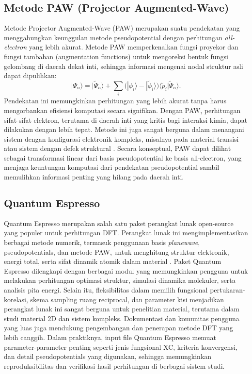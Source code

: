\subsection{Metode PAW (Projector Augmented-Wave)}
Metode Projector Augmented-Wave (PAW) merupakan suatu pendekatan yang menggabungkan keunggulan metode pseudopotential dengan perhitungan \emph{all-electron} yang lebih akurat.
Metode PAW memperkenalkan fungsi proyekor dan fungsi tambahan (augmentation functions) untuk mengoreksi bentuk fungsi gelombang di daerah dekat inti, sehingga informasi mengenai nodal struktur asli dapat dipulihkan:
\begin{equation}
|\Psi_n\rangle = |\tilde{\Psi}_n\rangle + \sum_i \Big(|\phi_i\rangle - |\tilde{\phi}_i\rangle\Big) \langle \tilde{p}_i |
\tilde{\Psi}_n \rangle.
\end{equation}
Pendekatan ini memungkinkan perhitungan yang lebih akurat tanpa harus mengorbankan efisiensi komputasi secara signifikan.
Dengan PAW, perhitungan sifat-sifat elektron, terutama di daerah inti yang kritis bagi interaksi kimia, dapat dilakukan dengan lebih tepat.
Metode ini juga sangat berguna dalam menangani sistem dengan konfigurasi elektronik kompleks, misalnya pada material transisi atau sistem dengan defek struktural \citep{Blochl1994}.
Secara konseptual, PAW dapat dilihat sebagai transformasi linear dari basis pseudopotential ke basis all-electron, yang menjaga keuntungan komputasi dari pendekatan pseudopotential sambil memulihkan informasi penting yang hilang pada daerah inti.

\subsection{Quantum Espresso}
Quantum Espresso merupakan salah satu paket perangkat lunak open-source yang populer untuk perhitungan DFT.
Perangkat lunak ini mengimplementasikan berbagai metode numerik, termasuk penggunaan basis \emph{planewave}, pseudopotentials, dan metode PAW, untuk menghitung struktur elektronik, energi total, serta sifat dinamik atomik dalam material \citep{Giannozzi2009}.
Paket Quantum Espresso dilengkapi dengan berbagai modul yang memungkinkan pengguna untuk melakukan perhitungan optimasi struktur, simulasi dinamika molekuler, serta analisis pita energi.
Selain itu, fleksibilitas dalam memilih fungsional pertukaran-korelasi, skema sampling ruang reciprocal, dan parameter kisi menjadikan perangkat lunak ini sangat berguna untuk penelitian material, terutama dalam studi material 2D dan sistem kompleks.
Dokumentasi dan komunitas pengguna yang luas juga mendukung pengembangan dan penerapan metode DFT yang lebih canggih.
Dalam praktiknya, input file Quantum Espresso memuat parameter-parameter penting seperti jenis fungsional XC, kriteria konvergensi, dan detail pseudopotentials yang digunakan, sehingga memungkinkan reproduksibilitas dan verifikasi hasil perhitungan di berbagai sistem studi.

